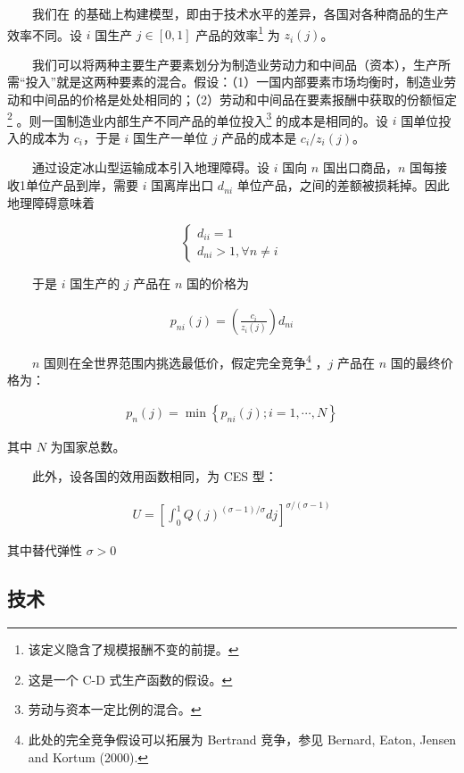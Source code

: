 \documentclass[
]{article}
\begin{document}
　　我们在 \citet{DFS1977} 的基础上构建模型，即由于技术水平的差异，各国对各种商品的生产效率不同。设 \(i\) 国生产 \(j\in[0,1]\) 产品的效率\footnote{该定义隐含了规模报酬不变的前提。} 为 \(z_i(j)\)。

　　我们可以将两种主要生产要素划分为制造业劳动力和中间品（资本），生产所需``投入''就是这两种要素的混合。假设：（1）一国内部要素市场均衡时，制造业劳动和中间品的价格是处处相同的；（2）劳动和中间品在要素报酬中获取的份额恒定\footnote{这是一个 C-D 式生产函数的假设。} 。则一国制造业内部生产不同产品的单位投入\footnote{劳动与资本一定比例的混合。} 的成本是相同的。设 \(i\) 国单位投入的成本为 \(c_i\)，于是 \(i\) 国生产一单位 \(j\) 产品的成本是 \({c_i}/{z_i(j)}\)。

　　通过设定冰山型运输成本引入地理障碍。设 \(i\) 国向 \(n\) 国出口商品，\(n\) 国每接收1单位产品到岸，需要 \(i\) 国离岸出口 \(d_{ni}\) 单位产品，之间的差额被损耗掉。因此地理障碍意味着

\[
\left\{\begin{array}{c}{d_{i i}=1} \\ {d_{n i}>1, \forall n \neq i}\end{array}\right.
\]

　　于是 \(i\) 国生产的 \(j\) 产品在 \(n\) 国的价格为

\begin{align}
p_{ni}(j)=(\frac {c_i}{z_i(j)})d_{ni} \label{eq:1}
\end{align}

　　\(n\) 国则在全世界范围内挑选最低价，假定完全竞争\footnote{此处的完全竞争假设可以拓展为 Bertrand 竞争，参见 Bernard, Eaton, Jensen and Kortum (2000).} ，\(j\) 产品在 \(n\) 国的最终价格为：

\begin{align}
p_{n}(j)=\min \left\{p_{n i}(j) ; i=1, \cdots, N\right\}  \label{eq:2}
\end{align}

其中 \(N\) 为国家总数。

　　此外，设各国的效用函数相同，为 CES 型：

\begin{align}
U=\left[\int_{0}^{1} Q(j)^{(\sigma-1) / \sigma} d j\right]^{\sigma /(\sigma-1)} \label{eq:3}
\end{align}

其中替代弹性 \(\sigma>0\)

\hypertarget{ux6280ux672f}{%
\subsection{技术}\label{ux6280ux672f}}
\end{document}
